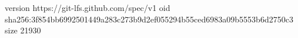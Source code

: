 version https://git-lfs.github.com/spec/v1
oid sha256:3f854bb6992501449a283c273b9d2ef055294b55ced6983a09b5553b6d2750c3
size 21930

